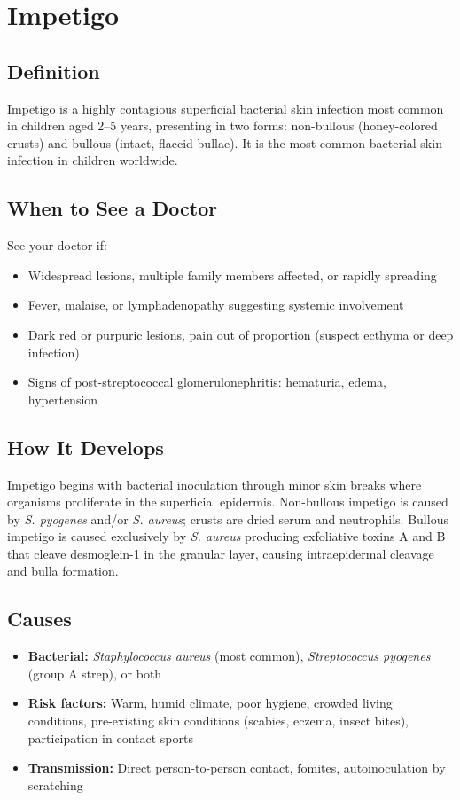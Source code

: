 \chapter{Impetigo}

\section*{Definition}
Impetigo is a highly contagious superficial bacterial skin infection most common in children aged 2--5 years, presenting in two forms: non-bullous (honey-colored crusts) and bullous (intact, flaccid bullae). It is the most common bacterial skin infection in children worldwide.

\section*{When to See a Doctor}
See your doctor if:
\begin{itemize}
  \item Widespread lesions, multiple family members affected, or rapidly spreading
  \item Fever, malaise, or lymphadenopathy suggesting systemic involvement
  \item Dark red or purpuric lesions, pain out of proportion (suspect ecthyma or deep infection)
  \item Signs of post-streptococcal glomerulonephritis: hematuria, edema, hypertension
\end{itemize}

\section*{How It Develops}
Impetigo begins with bacterial inoculation through minor skin breaks where organisms proliferate in the superficial epidermis. Non-bullous impetigo is caused by \textit{S. pyogenes} and/or \textit{S. aureus}; crusts are dried serum and neutrophils. Bullous impetigo is caused exclusively by \textit{S. aureus} producing exfoliative toxins A and B that cleave desmoglein-1 in the granular layer, causing intraepidermal cleavage and bulla formation.

\section*{Causes}
\begin{itemize}
  \item \textbf{Bacterial:} \textit{Staphylococcus aureus} (most common), \textit{Streptococcus pyogenes} (group A strep), or both
  \item \textbf{Risk factors:} Warm, humid climate, poor hygiene, crowded living conditions, pre-existing skin conditions (scabies, eczema, insect bites), participation in contact sports
  \item \textbf{Transmission:} Direct person-to-person contact, fomites, autoinoculation by scratching
\end{itemize}

